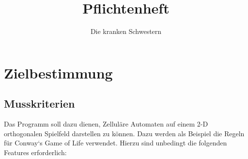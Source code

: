 \documentclass[11pt]{article}
\begin{document}

\title{Pflichtenheft}

\author{Die kranken Schwestern}

\tableofcontents
\pagebreak

\section{Zielbestimmung}
\subsection{Musskriterien}
Das Programm soll dazu dienen, Zelluläre Automaten auf einem 2-D orthogonalen Spielfeld darstellen zu können. Dazu werden als Beispiel die Regeln für Conway`s Game of Life verwendet.
Hierzu sind unbedingt die folgenden Features erforderlich:

\par
\end{document}
